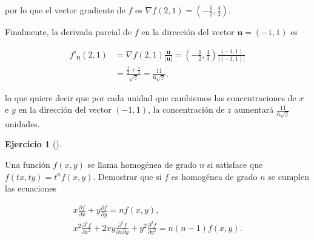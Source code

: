 \documentclass[
  spanish,
  a4paper,
]{scrreport}
\theoremstyle{definition}
\newtheorem{exercise}{Ejercicio}[chapter]
\theoremstyle{remark}
\begin{document}
\begin{tcolorbox}
por lo que el vector gradiente de \(f\) es
\(\nabla f(2,1) = \left(-\frac{1}{2}, \frac{4}{3}\right)\).

Finalmente, la derivada parcial de \(f\) en la dirección del vector
\(\mathbf{u}=(-1,1)\) es

\begin{align*}
f'_{\mathbf{u}}(2,1) 
&= \nabla f(2,1)\frac{\mathbf{u}}{|\mathbf{u}|} 
= \left(-\frac{1}{2}, \frac{4}{3}\right)\frac{(-1,1)}{|(-1,1)|} \\
&= \frac{\frac{1}{2}+\frac{4}{3}}{\sqrt{2}}
= \frac{11}{6\sqrt{2}},
\end{align*}

lo que quiere decir que por cada unidad que cambiemos las
concentraciones de \(x\) e \(y\) en la dirección del vector \((-1,1)\),
la concentración de \(z\) aumentará \(\frac{11}{6\sqrt{2}}\) unidades.

\end{tcolorbox}

\begin{exercise}[]\protect\hypertarget{exr-funcion-homogenea}{}\label{exr-funcion-homogenea}

Una función \(f(x,y)\) se llama homogénea de grado \(n\) si satisface
que \(f(tx, ty) = t^nf(x,y)\). Demostrar que si \(f\) es homogénea de
grado \(n\) se cumplen las ecuaciones

\[
\begin{gathered}
x\frac{\partial f}{\partial x} + y \frac{\partial f}{\partial y} = nf(x,y),\\
x^2\frac{\partial^2 f}{\partial x^2} + 2xy \frac{\partial^2 f}{\partial x \partial y} + y^2 \frac{\partial^2 f}{\partial y^2} = n(n-1)f(x,y).
\end{gathered}
\]

\end{exercise}
\end{document}
